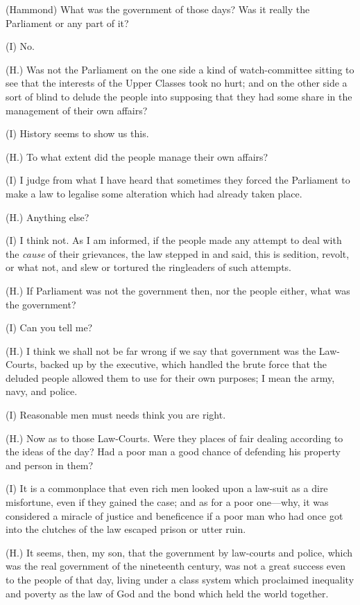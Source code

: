 (Hammond) What was the government of those days? Was it really the
Parliament or any part of it?

(I) No.

(H.) Was not the Parliament on the one side a kind of watch-committee
sitting to see that the interests of the Upper Classes took no hurt; and
on the other side a sort of blind to delude the people into supposing
that they had some share in the management of their own affairs?

(I) History seems to show us this.

(H.) To what extent did the people manage their own affairs?

(I) I judge from what I have heard that sometimes they forced the
Parliament to make a law to legalise some alteration which had already
taken place.

(H.) Anything else?

(I) I think not. As I am informed, if the people made any attempt to
deal with the \emph{cause} of their grievances, the law stepped in and
said, this is sedition, revolt, or what not, and slew or tortured the
ringleaders of such attempts.

(H.) If Parliament was not the government then, nor the people either,
what was the government?

(I) Can you tell me?

(H.) I think we shall not be far wrong if we say that government was the
Law-Courts, backed up by the executive, which handled the brute force
that the deluded people allowed them to use for their own purposes; I
mean the army, navy, and police.

(I) Reasonable men must needs think you are right.

(H.) Now as to those Law-Courts. Were they places of fair dealing
according to the ideas of the day? Had a poor man a good chance of
defending his property and person in them?

(I) It is a commonplace that even rich men looked upon a law-suit as a
dire misfortune, even if they gained the case; and as for a poor
one---why, it was considered a miracle of justice and beneficence if a
poor man who had once got into the clutches of the law escaped prison or
utter ruin.

(H.) It seems, then, my son, that the government by law-courts and
police, which was the real government of the nineteenth century, was not
a great success even to the people of that day, living under a class
system which proclaimed inequality and poverty as the law of God and the
bond which held the world together.

